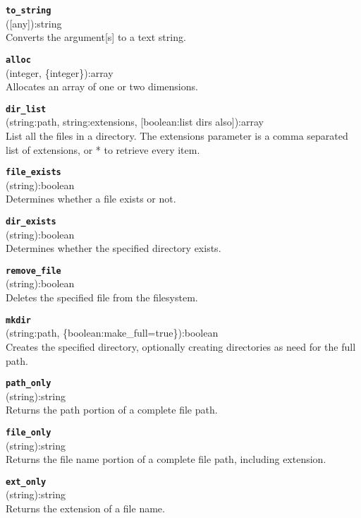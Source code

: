 \documentclass{article}
\begin{document}
{\large \texttt{\textbf{to\_string}}}\\
\textsf{ ([any]):string }\\
Converts the argument[s] to a text string.

{\large \texttt{\textbf{alloc}}}\\
\textsf{ (integer, \{integer\}):array }\\
Allocates an array of one or two dimensions.

{\large \texttt{\textbf{dir\_list}}}\\
\textsf{ (string:path, string:extensions, [boolean:list dirs also]):array }\\
List all the files in a directory. The extensions parameter is a comma separated list of extensions, or * to retrieve every item.

{\large \texttt{\textbf{file\_exists}}}\\
\textsf{ (string):boolean }\\
Determines whether a file exists or not.

{\large \texttt{\textbf{dir\_exists}}}\\
\textsf{ (string):boolean }\\
Determines whether the specified directory exists.

{\large \texttt{\textbf{remove\_file}}}\\
\textsf{ (string):boolean }\\
Deletes the specified file from the filesystem.

{\large \texttt{\textbf{mkdir}}}\\
\textsf{ (string:path, \{boolean:make\_full=true\}):boolean }\\
Creates the specified directory, optionally creating directories as need for the full path.

{\large \texttt{\textbf{path\_only}}}\\
\textsf{ (string):string }\\
Returns the path portion of a complete file path.

{\large \texttt{\textbf{file\_only}}}\\
\textsf{ (string):string }\\
Returns the file name portion of a complete file path, including extension.

{\large \texttt{\textbf{ext\_only}}}\\
\textsf{ (string):string }\\
Returns the extension of a file name.
\end{document}
